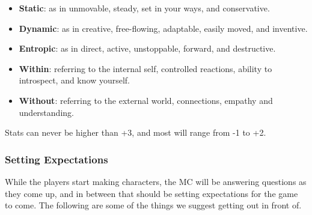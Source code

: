 \documentclass[
]{article}
\providecommand{\tightlist}{%
  \setlength{\itemsep}{0pt}\setlength{\parskip}{0pt}}
\begin{document}
\begin{itemize}
\tightlist
\item
  \textbf{Static}: as in unmovable, steady, set in your ways, and
  conservative.
\item
  \textbf{Dynamic}: as in creative, free-flowing, adaptable, easily
  moved, and inventive.
\item
  \textbf{Entropic}: as in direct, active, unstoppable, forward, and
  destructive.
\item
  \textbf{Within}: referring to the internal self, controlled reactions,
  ability to introspect, and know yourself.
\item
  \textbf{Without}: referring to the external world, connections,
  empathy and understanding.
\end{itemize}

Stats can never be higher than +3, and most will range from -1 to +2.

\hypertarget{setting-expectations}{%
\subsubsection{Setting Expectations}\label{setting-expectations}}

While the players start making characters, the MC will be answering
questions as they come up, and in between that should be setting
expectations for the game to come. The following are some of the things
we suggest getting out in front of.
\end{document}
